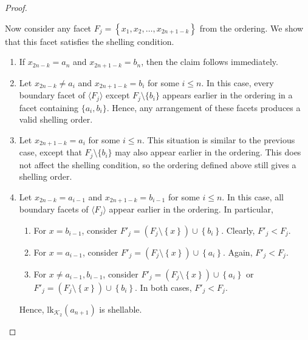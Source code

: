 \documentclass[11pt,reqno,a4paper]{amsart}
\theoremstyle{definition}
\theoremstyle{theorem}
\newcommand{\lno}{\left(}
\newcommand{\rno}{\right)}
\newcommand{\lcu}{\left\{}
\newcommand{\rcu}{\right\}}
\newcommand{\K}{\mathcal{K}}
\newcommand{\lk}{\mathrm{lk}}
\theoremstyle{remark}
\begin{document}
\begin{proof}
\begin{enumerate}
\begin{itemize}
			Now consider any facet $F_j = \lcu x_1, x_2, \dots, x_{2n+1-k} \rcu$ from the ordering. We show that this facet satisfies the shelling condition.
			
			\begin{enumerate}
				\item If $x_{2n-k}=a_n$ and $x_{2n+1-k}=b_n$, then the claim follows immediately.
				
				\item Let $x_{2n-k}\neq a_i$ and $x_{2n+1-k}=b_i$ for some $i \leq n$. In this case, every boundary facet of $\langle F_j\rangle$ except $F_j \setminus \{b_i\}$ appears earlier in the ordering in a facet containing $\{a_i,b_i\}$. Hence, any arrangement of these facets produces a valid shelling order.
				
				\item Let $x_{2n+1-k}=a_i$ for some $i \leq n$. This situation is similar to the previous case, except that $F_j \setminus \{b_i\}$ may also appear earlier in the ordering. This does not affect the shelling condition, so the ordering defined above still gives a shelling order.
				
				\item Let $x_{2n-k}=a_{i-1}$ and $x_{2n+1-k}=b_{i-1}$ for some $i \leq n$. In this case, all boundary facets of $\langle F_j\rangle$ appear earlier in the ordering. In particular,
				
				\begin{enumerate}
					\item For $x=b_{i-1}$, consider $F'_j = \lno F_j \setminus \lcu x \rcu \rno \cup \lcu b_i \rcu.$ Clearly, $F'_j < F_j$.
					
					\item For $x=a_{i-1}$, consider $F'_j = (F_j \setminus \lcu x \rcu) \cup \lcu a_i \rcu.$ Again, $F'_j < F_j$.
					
					\item For $x \neq a_{i-1}, b_{i-1}$, consider $F'_j = \lno F_j \setminus \lcu x \rcu \rno \cup \lcu a_i \rcu$ or $	F'_j = (F_j \setminus \lcu x \rcu) \cup \lcu b_i \rcu.$	In both cases, $F'_j < F_j$.
				\end{enumerate}
				Hence, $\lk_{\K_2}\lno a_{n+1} \rno$ is shellable. 
				
			\end{enumerate}
			

\end{itemize}
\end{enumerate}
\end{proof}
\end{document}

